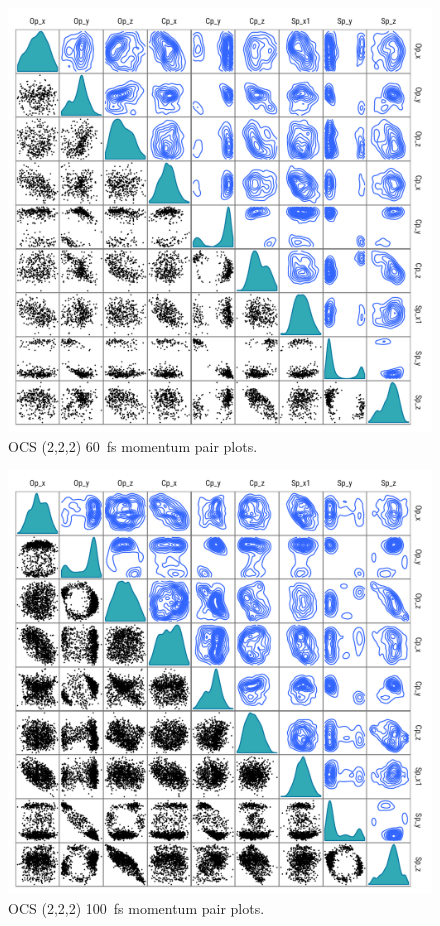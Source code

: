 \begin{figure}
  \centering
  \includegraphics[width=\textwidth]{Plots/OCS22260fsMomentumPairPlots}
  \caption[OCS (2,2,2) \SI{60}{\fs} momentum pair plots.]
  {OCS (2,2,2) \SI{60}{\fs} momentum pair plots.}
  \label{fig:OCS22260fsMomentumPairPlots}
\end{figure}

\begin{figure}
  \centering
  \includegraphics[width=\textwidth]{Plots/OCS222100fsMomentumPairPlots}
  \caption[OCS (2,2,2) \SI{100}{\fs} momentum pair plots.]
  {OCS (2,2,2) \SI{100}{\fs} momentum pair plots.}
  \label{fig:OCS222100fsMomentumPairPlots}
\end{figure}

